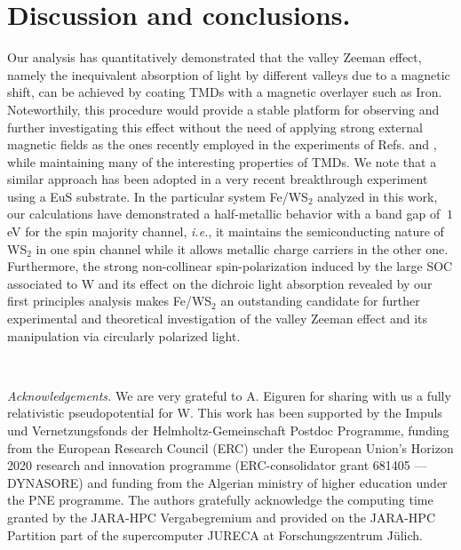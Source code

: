 \documentclass[aps,prb,showpacs,preprintnumbers,twocolumn,amsmath,amssymb]{revtex4-1}
\begin{document}
\section{Discussion and conclusions.} Our analysis has quantitatively demonstrated that the valley Zeeman effect, namely the inequivalent absorption of light by different valleys due to a magnetic shift,
can be achieved by coating TMDs with a magnetic overlayer such as Iron.
Noteworthily, this procedure would provide a stable platform for observing and further investigating this effect without the need of applying strong external magnetic fields as the ones recently employed in the experiments of Refs.  and , while maintaining many of the interesting properties of TMDs. 
We note that a similar approach has been adopted in a very recent breakthrough experiment using a EuS substrate\cite{Zhao2017}.
In the particular system Fe/WS$_2$ analyzed in this work, our calculations have demonstrated a half-metallic behavior with a band gap of $~1$ eV for the spin majority channel, \textit{i.e.}, it maintains the semiconducting nature of WS$_2$ in one spin channel while it allows metallic charge carriers in the other one. Furthermore, the strong non-collinear spin-polarization induced by the large SOC associated to W and its effect on the dichroic light absorption revealed by our first principles analysis makes  Fe/WS$_2$ an outstanding candidate for further experimental and theoretical investigation
of the valley Zeeman effect and its manipulation via circularly polarized light.


 
\

\textit{Acknowledgements.}
We are very grateful to A. Eiguren for sharing with us a fully relativistic pseudopotential for W. This work has been supported by the Impuls und
Vernetzungsfonds der Helmholtz-Gemeinschaft Postdoc Programme, funding from the European Research Council (ERC) under the European Union's Horizon 2020 research and innovation 
programme (ERC-consolidator grant 681405 — DYNASORE) and funding from the Algerian ministry of higher education under the PNE programme. The authors gratefully acknowledge the computing 
time granted by the JARA-HPC Vergabegremium and provided 
on the JARA-HPC Partition part of the supercomputer JURECA at Forschungszentrum J\"{u}lich.

%
%
%


\end{document}
